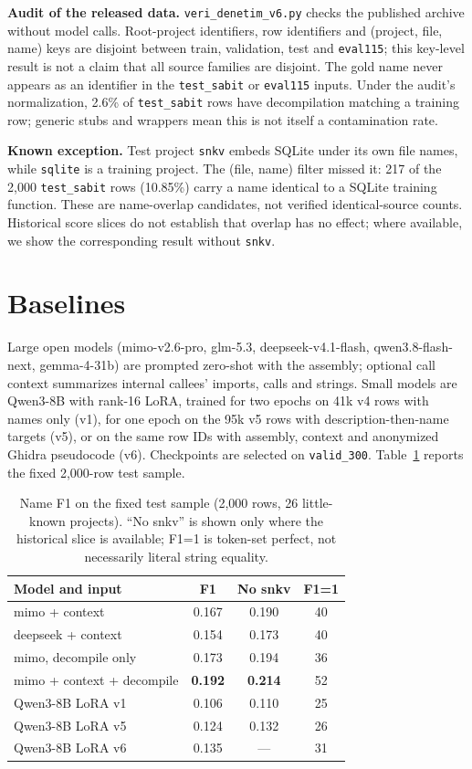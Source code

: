 \documentclass[conference]{IEEEtran}
\begin{document}
\textbf{Audit of the released data.} \texttt{veri\_denetim\_v6.py} checks the published archive without model calls. Root-project identifiers, row identifiers and (project, file, name) keys are disjoint between train, validation, test and \texttt{eval115}; this key-level result is not a claim that all source families are disjoint. The gold name never appears as an identifier in the \texttt{test\_sabit} or \texttt{eval115} inputs. Under the audit's normalization, 2.6\% of \texttt{test\_sabit} rows have decompilation matching a training row; generic stubs and wrappers mean this is not itself a contamination rate.

\textbf{Known exception.} Test project \texttt{snkv} embeds SQLite under its own file names, while \texttt{sqlite} is a training project. The (file, name) filter missed it: 217 of the 2,000 \texttt{test\_sabit} rows (10.85\%) carry a name identical to a SQLite training function. These are name-overlap candidates, not verified identical-source counts. Historical score slices do not establish that overlap has no effect; where available, we show the corresponding result without \texttt{snkv}.

\section{Baselines}
Large open models (mimo-v2.6-pro, glm-5.3, deepseek-v4.1-flash, qwen3.8-flash-next, gemma-4-31b) are prompted zero-shot with the assembly; optional call context summarizes internal callees' imports, calls and strings. Small models are Qwen3-8B with rank-16 LoRA, trained for two epochs on 41k v4 rows with names only (v1), for one epoch on the 95k v5 rows with description-then-name targets (v5), or on the same row IDs with assembly, context and anonymized Ghidra pseudocode (v6). Checkpoints are selected on \texttt{valid\_300}. Table~\ref{tab:base} reports the fixed 2,000-row test sample.

\begin{table}[t]
\centering
\caption{Name F1 on the fixed test sample (2,000 rows, 26 little-known projects). ``No snkv'' is shown only where the historical slice is available; F1=1 is token-set perfect, not necessarily literal string equality.}
\label{tab:base}
\begin{tabular}{lccc}
\toprule
Model and input & F1 & No snkv & F1=1 \\
\midrule
mimo + context & 0.167 & 0.190 & 40 \\
deepseek + context & 0.154 & 0.173 & 40 \\
mimo, decompile only & 0.173 & 0.194 & 36 \\
mimo + context + decompile & \textbf{0.192} & \textbf{0.214} & 52 \\
\midrule
Qwen3-8B LoRA v1 & 0.106 & 0.110 & 25 \\
Qwen3-8B LoRA v5 & 0.124 & 0.132 & 26 \\
Qwen3-8B LoRA v6 & 0.135 & --- & 31 \\
\bottomrule
\end{tabular}
\end{table}
\end{document}
